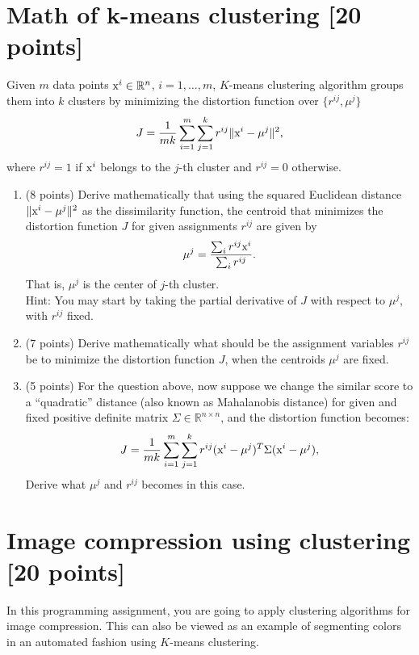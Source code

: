 \documentclass[twoside,10pt]{article}
\begin{document}
\section{Math of k-means clustering [20 points]}
 Given $m$ data points $\text x^i \in \mathbb R^{n}$, $i=1,\dots, m$, $K$-means clustering algorithm groups them into $k$ clusters by minimizing the distortion function over $\{ r^{ij}, \mu^j \}$
\begin{equation}
J = \frac{1}{mk}\sum_{i=1}^m\sum_{j=1}^k r^{ij} \|\text x^i-\mu^j\|^2,
\label{J_def}
\end{equation}
where $r^{ij}=1$ if $\text x^i$ belongs to the $j$-th cluster and $r^{ij}=0$ otherwise.

\begin{enumerate}

\item (8 points) Derive mathematically that using the squared Euclidean distance $\|\text x^i-\mu^j\|^2$ as the dissimilarity function, the centroid that minimizes the distortion function $J$  for given assignments $r^{ij}$ are given by
   $$\mu^j=\frac{\sum_i r^{ij} \text x^i}{\sum_i r^{ij}}.$$
   That is, $\mu^j$ is the center of $j$-th cluster.  \\
   Hint: You may start by taking the partial derivative of $J$ with respect to $\mu^j$, with $r^{ij}$ fixed.
   
   
\item (7 points) Derive mathematically what should be the assignment variables $r^{ij}$ be to minimize the distortion function $J$, when the centroids $\mu^j$ are fixed.

\item (5 points) For the question above, now suppose we change the similar score to a ``quadratic'' distance (also known as Mahalanobis distance) for given and fixed positive definite matrix $\Sigma \in \mathbb R^{n\times n}$, and the distortion function becomes:
\[
J = \frac{1}{mk}\sum_{i=1}^m\sum_{j=1}^k r^{ij} (\text x^i-\mu^j)^T \Sigma  (\text x^i-\mu^j),
\]
Derive what $\mu^{j}$ and $r^{ij}$ becomes in this case.

\end{enumerate}



\section{Image compression using clustering [20 points]}

In this programming assignment, you are going to apply clustering algorithms for image compression. This can also be viewed as an example of segmenting colors in an automated fashion using $K$-means clustering.
\end{document}
